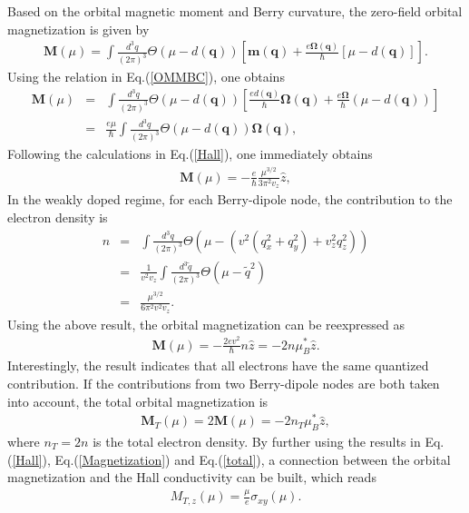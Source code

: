 \documentclass[aps,prl,twocolumn,longbibliography]{revtex4-1}
\newcommand{\bq}{\boldsymbol q}
\newcommand{\bM}{\boldsymbol M}
\newcommand{\bOmega}{\boldsymbol{\Omega}}
\begin{document}
\begin{widetext}

Based on the orbital magnetic moment and Berry curvature, the zero-field orbital magnetization is given by~\cite{Xiao2005OM}
\begin{eqnarray}
	\bM(\mu)=\int\frac{d^{3}q}{(2\pi)^{3}}\Theta(\mu-d(\bq))\left[\boldsymbol{m}(\bq)+\frac{e\bOmega(\bq)}{\hbar}[\mu-d(\bq)]\right].
\end{eqnarray}
Using the relation in Eq.(\ref{OMMBC}), one obtains
\begin{eqnarray}
	\bM(\mu)&=&\int\frac{d^{3}q}{(2\pi)^{3}}\Theta(\mu-d(\bq))\left[\frac{ed(\bq)}{\hbar}\bOmega(\bq)+\frac{e\bOmega}{\hbar}(\mu-d(\bq))\right]\nonumber\\
	&=&\frac{e\mu}{\hbar}\int\frac{d^{3}q}{(2\pi)^{3}}\Theta(\mu-d(\bq))\bOmega(\bq),
\end{eqnarray}
Following the calculations in Eq.(\ref{Hall}), one immediately obtains
\begin{eqnarray}
	\bM(\mu)=-\frac{e}{\hbar}\frac{\mu^{3/2}}{3\pi^{2}v_{z}} \hat{z},\label{Magnetization}
\end{eqnarray}
In the weakly doped regime, for each Berry-dipole node, the contribution to the electron density is
\begin{eqnarray}
n&=&\int\frac{d^{3}q}{(2\pi)^{3}}\Theta(\mu-(v^{2}(q_{x}^{2}+q_{y}^{2})+v_{z}^{2}q_{z}^{2}))\nonumber\\
&=&\frac{1}{v^{2}v_{z}}\int\frac{d^{3}\tilde{q}}{(2\pi)^{3}}\Theta(\mu-\tilde{q}^{2})\nonumber\\
&=&\frac{\mu^{3/2}}{6\pi^{2}v^{2}v_{z}}.
\end{eqnarray}
Using the above result, the orbital magnetization can be reexpressed as
\begin{eqnarray}
	\bM(\mu)=-\frac{2ev^{2}}{\hbar}n \hat{z}=-2n\mu_{B}^{*}\hat{z}.
\end{eqnarray}
Interestingly, the result indicates that all electrons have the same quantized contribution. If the contributions from
two Berry-dipole nodes are both taken into account, the total orbital magnetization is
\begin{eqnarray}
	\bM_{T}(\mu)=2\bM(\mu)=-2n_{T}\mu_{B}^{*}\hat{z}, \label{total}
\end{eqnarray}
where $n_{T}=2n$ is the total electron density. By further using the results in Eq.(\ref{Hall}),
Eq.(\ref{Magnetization}) and Eq.(\ref{total}), a connection between the orbital magnetization and the Hall conductivity
can be built, which reads
\begin{eqnarray}
M_{T,z}(\mu)=\frac{\mu}{e}\sigma_{xy}(\mu).
\end{eqnarray}


\end{widetext}
\end{document}
